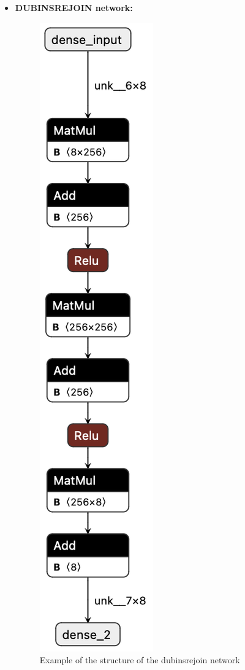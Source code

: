 \begin{itemize}
    \item \textbf{DUBINSREJOIN network:}
    \begin{figure}[H]
        \caption{\label{fig:dubins-network} Example of the structure of the dubinsrejoin network}
        \centering
        \includegraphics[scale=0.4]{"Chapter7/img/dubinsrejoin.png"}

\end{figure}
\end{itemize}
